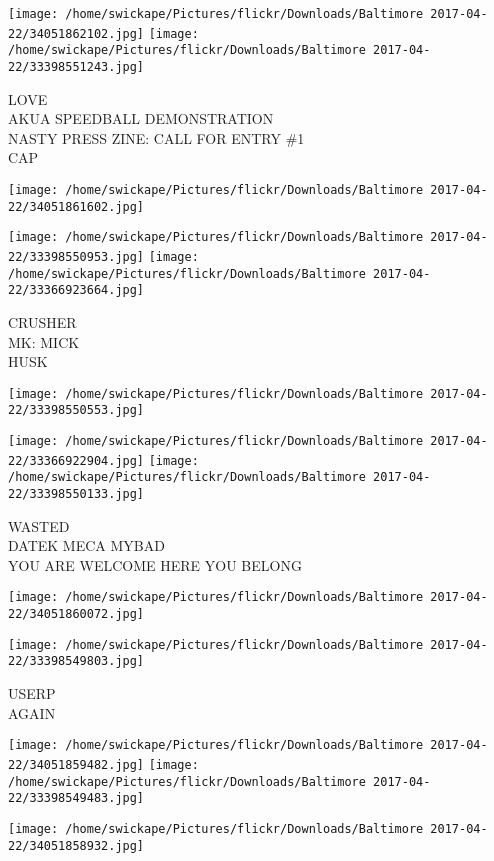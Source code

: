 \documentclass[10pt,letterpaper]{article}
\begin{document}
\texttt{[image: /home/swickape/Pictures/flickr/Downloads/Baltimore 2017-04-22/34051862102.jpg]}
\texttt{[image: /home/swickape/Pictures/flickr/Downloads/Baltimore 2017-04-22/33398551243.jpg]}

LOVE\\
AKUA SPEEDBALL DEMONSTRATION\\
NASTY PRESS ZINE: CALL FOR ENTRY \#1\\
CAP
\pagebreak

\texttt{[image: /home/swickape/Pictures/flickr/Downloads/Baltimore 2017-04-22/34051861602.jpg]}

\vspace{0.25in}
\texttt{[image: /home/swickape/Pictures/flickr/Downloads/Baltimore 2017-04-22/33398550953.jpg]}
\texttt{[image: /home/swickape/Pictures/flickr/Downloads/Baltimore 2017-04-22/33366923664.jpg]}

CRUSHER\\
MK: MICK\\
HUSK
\pagebreak

\texttt{[image: /home/swickape/Pictures/flickr/Downloads/Baltimore 2017-04-22/33398550553.jpg]}

\vspace{0.25in}
\texttt{[image: /home/swickape/Pictures/flickr/Downloads/Baltimore 2017-04-22/33366922904.jpg]}
\texttt{[image: /home/swickape/Pictures/flickr/Downloads/Baltimore 2017-04-22/33398550133.jpg]}

WASTED\\
DATEK MECA MYBAD\\
YOU ARE WELCOME HERE YOU BELONG
\pagebreak

\texttt{[image: /home/swickape/Pictures/flickr/Downloads/Baltimore 2017-04-22/34051860072.jpg]}

\vspace{0.25in}
\texttt{[image: /home/swickape/Pictures/flickr/Downloads/Baltimore 2017-04-22/33398549803.jpg]}

USERP\\
AGAIN
\pagebreak

\texttt{[image: /home/swickape/Pictures/flickr/Downloads/Baltimore 2017-04-22/34051859482.jpg]}
\texttt{[image: /home/swickape/Pictures/flickr/Downloads/Baltimore 2017-04-22/33398549483.jpg]}

\texttt{[image: /home/swickape/Pictures/flickr/Downloads/Baltimore 2017-04-22/34051858932.jpg]}
\end{document}

